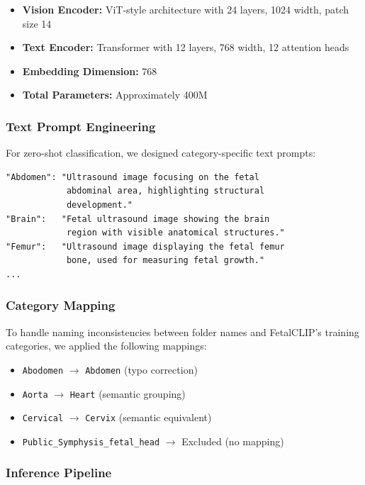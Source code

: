 \documentclass[11pt,a4paper]{article}
\begin{document}
\begin{itemize}
    \item \textbf{Vision Encoder:} ViT-style architecture with 24 layers, 1024 width, patch size 14
    \item \textbf{Text Encoder:} Transformer with 12 layers, 768 width, 12 attention heads
    \item \textbf{Embedding Dimension:} 768
    \item \textbf{Total Parameters:} Approximately 400M
\end{itemize}

\subsubsection{Text Prompt Engineering}

For zero-shot classification, we designed category-specific text prompts:

\begin{lstlisting}
"Abdomen": "Ultrasound image focusing on the fetal
            abdominal area, highlighting structural
            development."
"Brain":   "Fetal ultrasound image showing the brain
            region with visible anatomical structures."
"Femur":   "Ultrasound image displaying the fetal femur
            bone, used for measuring fetal growth."
...
\end{lstlisting}

\subsubsection{Category Mapping}

To handle naming inconsistencies between folder names and FetalCLIP's training categories, we applied the following mappings:

\begin{itemize}
    \item \texttt{Abodomen} $\rightarrow$ \texttt{Abdomen} (typo correction)
    \item \texttt{Aorta} $\rightarrow$ \texttt{Heart} (semantic grouping)
    \item \texttt{Cervical} $\rightarrow$ \texttt{Cervix} (semantic equivalent)
    \item \texttt{Public\_Symphysis\_fetal\_head} $\rightarrow$ Excluded (no mapping)
\end{itemize}

\subsubsection{Inference Pipeline}
\end{document}
